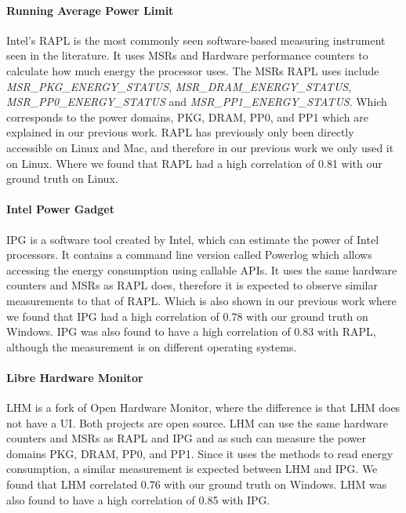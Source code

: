 \paragraph{Running Average Power Limit}
Intel's RAPL is the most commonly seen software-based measuring instrument seen in the literature. It uses MSRs and Hardware performance counters to calculate how much energy the processor uses. The MSRs RAPL uses include \textit{MSR\_PKG\_ENERGY\_STATUS}, \textit{MSR\_DRAM\_ENERGY\_STATUS}, \textit{MSR\_PP0\_ENERGY\_STATUS} and \textit{MSR\_PP1\_ENERGY\_STATUS}. Which corresponds to the power domains, PKG, DRAM, PP0, and PP1 which are explained in our previous work\cite{biksbois}. RAPL has previously only been directly accessible on Linux and Mac, and therefore in our previous work we only used it on Linux. Where we found that RAPL had a high correlation of 0.81 with our ground truth on Linux.\cite{biksbois}

\paragraph{Intel Power Gadget}
IPG is a software tool created by Intel, which can estimate the power of Intel processors. It contains a command line version called Powerlog which allows accessing the energy consumption using callable APIs. It uses the same hardware counters and MSRs as RAPL does, therefore it is expected to observe similar measurements to that of RAPL. Which is also shown in our previous work where we found that IPG had a high correlation of 0.78 with our ground truth on Windows. IPG was also found to have a high correlation of 0.83 with RAPL, although the measurement is on different operating systems.\cite{biksbois}





\paragraph{Libre Hardware Monitor}
LHM is a fork of Open Hardware Monitor, where the difference is that LHM does not have a UI. Both projects are open source. LHM can use the same hardware counters and MSRs as RAPL and IPG and as such can measure the power domains PKG, DRAM, PP0, and PP1. Since it uses the methods to read energy consumption, a similar measurement is expected between LHM and IPG. We found that LHM correlated 0.76 with our ground truth on Windows. LHM was also found to have a high correlation of 0.85 with IPG.\cite{biksbois}

